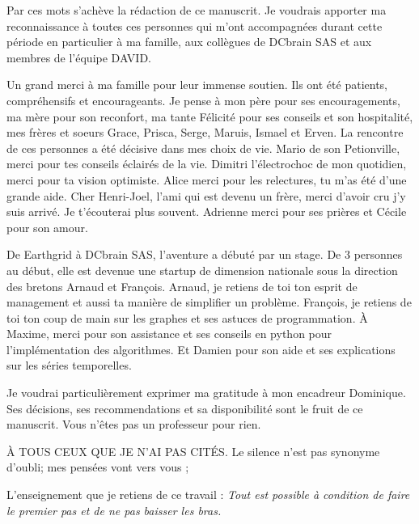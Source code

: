 

Par ces mots s'ach\`eve la r\'edaction de ce manuscrit.
Je voudrais apporter ma reconnaissance \`a toutes ces personnes qui m'ont accompagn\'ees durant cette p\'eriode en particulier \`a ma famille, aux coll\`egues de DCbrain SAS et aux membres de l'\'equipe DAVID.
\newline 

Un grand merci \`a ma famille pour leur immense soutien. Ils ont \'et\'e patients, compr\'ehensifs et encourageants. Je pense \`a mon p\`ere pour ses encouragements, ma m\`ere pour son reconfort, ma tante F\'elicit\'e pour ses conseils et son hospitalit\'e, mes fr\`eres et soeurs Grace, Prisca, Serge, Maruis, Ismael et Erven. 
\newline
La rencontre de ces personnes a \'et\'e d\'ecisive dans mes choix de vie. 
Mario de son Petionville, merci pour tes conseils \'eclair\'es de la vie.
Dimitri l'\'electrochoc de mon quotidien, merci pour ta vision optimiste. 
Alice merci pour les relectures, tu m'as \'et\'e d'une grande aide.
Cher Henri-Joel, l'ami qui est devenu un fr\`ere, merci d'avoir cru j'y suis arriv\'e. Je t'\'ecouterai plus souvent.   
Adrienne merci pour ses pri\`eres et C\'ecile pour son amour.
\newline

De Earthgrid \`a DCbrain SAS, l'aventure a d\'ebut\'e par un stage. De $3$ personnes au d\'ebut, elle est devenue une startup de dimension nationale sous la direction des bretons Arnaud et Fran{\c c}ois. 
Arnaud, je retiens de toi ton esprit de management et aussi ta mani\`ere de simplifier un probl\`eme.
Fran{\c c}ois, je retiens  de toi ton  coup de main sur les graphes et ses astuces de programmation.
\`A Maxime, merci pour son assistance et ses conseils en python pour l'impl\'ementation des algorithmes.
Et Damien pour son aide et ses explications sur les s\'eries temporelles.
\newline

Je voudrai particuli\`erement exprimer ma gratitude \`a  mon encadreur Dominique. Ses d\'ecisions, ses recommendations et sa disponibilit\'e sont le fruit de ce manuscrit. 
Vous n'\^etes pas un professeur pour rien.
\newline

\`A TOUS CEUX QUE JE N'AI PAS CIT\'ES.
Le silence n'est pas synonyme d'oubli; mes pens\'ees vont vers vous ;
\newline

L'enseignement que je retiens de ce travail : \newline
{\em Tout est possible \`a condition de faire le premier pas et de ne pas baisser les bras.}
